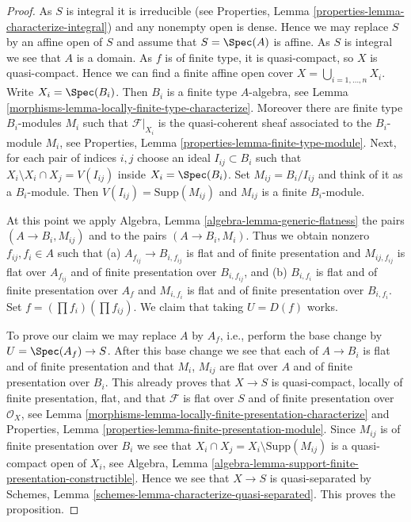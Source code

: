 \begin{proof}

As $S$ is integral it is irreducible (see
Properties, Lemma \ref{properties-lemma-characterize-integral})
and any nonempty open is dense. Hence we may replace
$S$ by an affine open of $S$ and assume that $S = \Spec(A)$ is
affine. As $S$ is integral we see that $A$ is a domain.
As $f$ is of finite type, it is quasi-compact, so $X$ is quasi-compact.
Hence we can find a finite affine open cover
$X = \bigcup_{i = 1, \ldots, n} X_i$. Write $X_i = \Spec(B_i)$.
Then $B_i$ is a finite type $A$-algebra, see
Lemma \ref{morphisms-lemma-locally-finite-type-characterize}.
Moreover there are finite type
$B_i$-modules $M_i$ such that $\mathcal{F}|_{X_i}$ is the
quasi-coherent sheaf associated to the $B_i$-module $M_i$, see
Properties, Lemma \ref{properties-lemma-finite-type-module}.
Next, for each pair of indices $i, j$ choose an ideal $I_{ij} \subset B_i$
such that $X_i \setminus X_i \cap X_j = V(I_{ij})$ inside
$X_i = \Spec(B_i)$. Set $M_{ij} = B_i/I_{ij}$ and think
of it as a $B_i$-module. Then $V(I_{ij}) = \text{Supp}(M_{ij})$
and $M_{ij}$ is a finite $B_i$-module.

\medskip\noindent
At this point we apply
Algebra, Lemma \ref{algebra-lemma-generic-flatness}
the pairs $(A \to B_i, M_{ij})$ and to the
pairs $(A \to B_i, M_i)$. Thus we obtain
nonzero $f_{ij}, f_i \in A$ such that (a) $A_{f_{ij}} \to B_{i, f_{ij}}$
is flat and of finite presentation and $M_{ij, f_{ij}}$ is flat
over $A_{f_{ij}}$ and of finite presentation over $B_{i, f_{ij}}$, and
(b) $B_{i, f_i}$ is flat and of finite presentation over $A_f$ and
$M_{i, f_i}$ is flat and of finite presentation over $B_{i, f_i}$. Set
$f = (\prod f_i) (\prod f_{ij})$.
We claim that taking $U = D(f)$ works.

\medskip\noindent
To prove our claim we may replace $A$ by $A_f$, i.e.,
perform the base change by $U = \Spec(A_f) \to S$.
After this base change we see that each of $A \to B_i$ is
flat and of finite presentation and that $M_i$, $M_{ij}$ are flat over $A$
and of finite presentation over $B_i$.
This already proves that $X \to S$ is quasi-compact,
locally of finite presentation, flat, and that $\mathcal{F}$
is flat over $S$ and of finite presentation over $\mathcal{O}_X$, see
Lemma \ref{morphisms-lemma-locally-finite-presentation-characterize}
and
Properties, Lemma \ref{properties-lemma-finite-presentation-module}.
Since $M_{ij}$ is of finite presentation over $B_i$ we see that
$X_i \cap X_j = X_i \setminus \text{Supp}(M_{ij})$ is a quasi-compact
open of $X_i$, see
Algebra, Lemma \ref{algebra-lemma-support-finite-presentation-constructible}.
Hence we see that $X \to S$ is quasi-separated by
Schemes, Lemma \ref{schemes-lemma-characterize-quasi-separated}.
This proves the proposition.
\end{proof}


